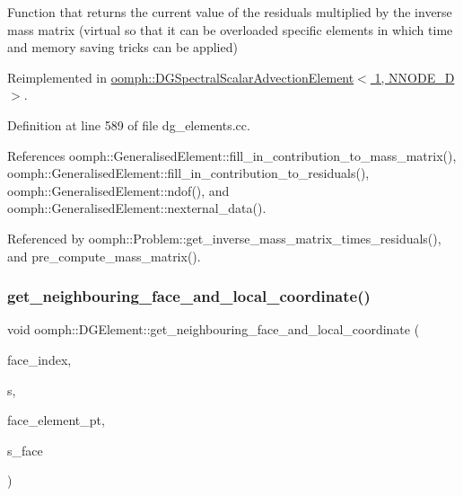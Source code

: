 Function that returns the current value of the residuals multiplied by the inverse mass matrix (virtual so that it can be overloaded specific elements in which time and memory saving tricks can be applied) 

Reimplemented in \hyperlink{classoomph_1_1DGSpectralScalarAdvectionElement_3_011_00_01NNODE__1D_01_4_af5e59ed30beabf17ae00ee64b19d8775}{oomph\+::\+D\+G\+Spectral\+Scalar\+Advection\+Element$<$ 1, N\+N\+O\+D\+E\+\_\+D $>$}.



Definition at line 589 of file dg\+\_\+elements.\+cc.



References oomph\+::\+Generalised\+Element\+::fill\+\_\+in\+\_\+contribution\+\_\+to\+\_\+mass\+\_\+matrix(), oomph\+::\+Generalised\+Element\+::fill\+\_\+in\+\_\+contribution\+\_\+to\+\_\+residuals(), oomph\+::\+Generalised\+Element\+::ndof(), and oomph\+::\+Generalised\+Element\+::nexternal\+\_\+data().



Referenced by oomph\+::\+Problem\+::get\+\_\+inverse\+\_\+mass\+\_\+matrix\+\_\+times\+\_\+residuals(), and pre\+\_\+compute\+\_\+mass\+\_\+matrix().

\mbox{\label{classoomph_1_1DGElement_aca2f5466e8f969d671ba71b976153629}} 
\subsubsection{\texorpdfstring{get\+\_\+neighbouring\+\_\+face\+\_\+and\+\_\+local\+\_\+coordinate()}{get\_neighbouring\_face\_and\_local\_coordinate()}}
{\footnotesize\ttfamily void oomph\+::\+D\+G\+Element\+::get\+\_\+neighbouring\+\_\+face\+\_\+and\+\_\+local\+\_\+coordinate (\begin{DoxyParamCaption}\item[{const int \&}]{face\+\_\+index,  }\item[{const \hyperlink{classoomph_1_1Vector}{Vector}$<$ double $>$ \&}]{s,  }\item[{\hyperlink{classoomph_1_1FaceElement}{Face\+Element} $\ast$\&}]{face\+\_\+element\+\_\+pt,  }\item[{\hyperlink{classoomph_1_1Vector}{Vector}$<$ double $>$ \&}]{s\+\_\+face }\end{DoxyParamCaption})}




